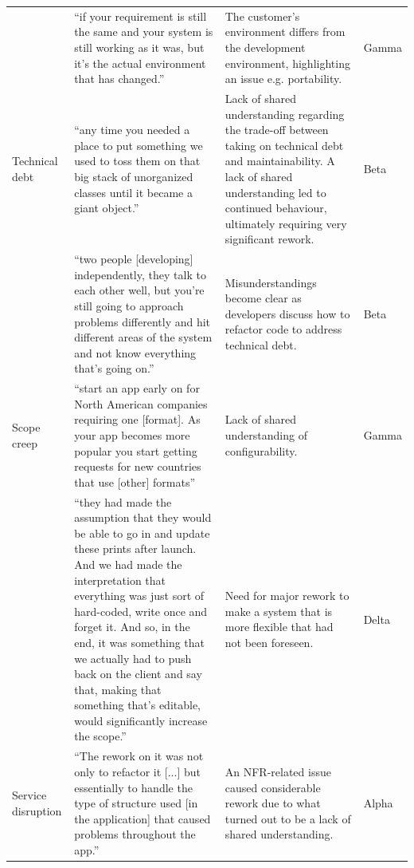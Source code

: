 \documentclass[smallextended]{svjour3}       %
\begin{document}
\begin{longtable}{P{1.5cm}p{4.8cm}p{3cm}p{1.3cm}}
\addlinespace

& ``if your requirement is still the same and your system is still working as it was, but it's the actual environment that has changed.''
& The customer's environment differs from the development environment, highlighting an issue e.g. portability. 
& Gamma\\

\addlinespace

Technical debt  &
``any time you needed a place to put something we used to toss them on that big stack of
unorganized classes until it became a giant object.''
& Lack of shared understanding regarding the trade-off between taking on technical debt and maintainability. A lack of shared understanding led to continued behaviour, ultimately requiring very significant rework. 
& Beta\\

\addlinespace

& ``two people [developing] independently, they talk to each other well, but you’re still going to approach problems differently and hit different areas of the system and not know everything that’s going on.''
& Misunderstandings become clear as developers discuss how to refactor code to address technical debt.
& Beta \\

\addlinespace

Scope creep 
&
``start an app early on for North American companies requiring one [format]. As your app becomes more popular you start getting requests for new countries that use [other] formats'' 
& Lack of shared understanding of configurability.
&  Gamma\\

\addlinespace

& ``they had made the assumption that they would be able to go in and update these prints after launch. And we had made the interpretation that everything was just sort of hard-coded, write once and forget it. And so, in the end, it was something that we actually had to push back on the client and say that, making that something that’s editable, would significantly increase the scope.''
& Need for major rework to make a system that is more flexible that had not been foreseen.
& Delta\\

\addlinespace
Service disruption &
``The rework on it was not only to refactor it [...] but essentially to handle the type of
structure used [in the application] that caused problems throughout the app.''
& An NFR-related issue caused considerable rework due to what turned out to be a lack of shared understanding.
& Alpha \\



\end{longtable}
\endgroup 
\end{document}

